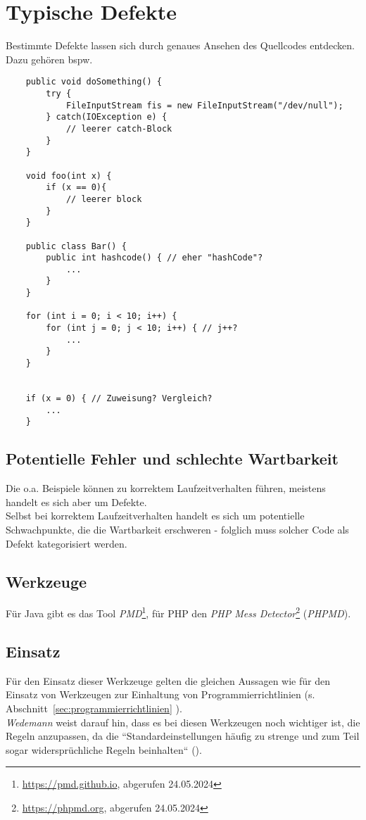 \section{Typische Defekte}\label{sec:typische-defekte}

Bestimmte Defekte lassen sich durch genaues Ansehen des Quellcodes entdecken. Dazu gehören bspw.

\begin{verbatim}
    public void doSomething() {
        try {
            FileInputStream fis = new FileInputStream("/dev/null");
        } catch(IOException e) {
            // leerer catch-Block
        }
    }

    void foo(int x) {
        if (x == 0){
            // leerer block
        }
    }

    public class Bar() {
        public int hashcode() { // eher "hashCode"?
            ...
        }
    }

    for (int i = 0; i < 10; i++) {
        for (int j = 0; j < 10; i++) { // j++?
            ...
        }
    }


    if (x = 0) { // Zuweisung? Vergleich?
        ...
    }
\end{verbatim}

\subsection*{Potentielle Fehler und schlechte Wartbarkeit}
Die o.a. Beispiele können zu korrektem Laufzeitverhalten führen, meistens handelt es sich aber um Defekte.\\
Selbst bei korrektem Laufzeitverhalten handelt es sich um potentielle Schwachpunkte, die die Wartbarkeit erschweren - folglich muss solcher Code als Defekt kategorisiert werden.

\subsection*{Werkzeuge}
Für Java gibt es das Tool \textit{PMD}\footnote{
    \url{https://pmd.github.io}, abgerufen 24.05.2024
}, für PHP den \textit{PHP Mess Detector}\footnote{
    \url{https://phpmd.org}, abgerufen 24.05.2024
} (\textit{PHPMD}).

\subsection*{Einsatz}
Für den Einsatz dieser Werkzeuge gelten die gleichen Aussagen wie für den Einsatz von Werkzeugen zur Einhaltung von Programmierrichtlinien (s. Abschnitt~\ref{sec:programmierrichtlinien}
).\\
\textit{Wedemann} weist darauf hin, dass es bei diesen Werkzeugen noch wichtiger ist, die Regeln anzupassen, da die ``Standardeinstellungen häufig zu strenge und zum Teil sogar widersprüchliche Regeln beinhalten`` (\cite[31]{Wed09c}).

